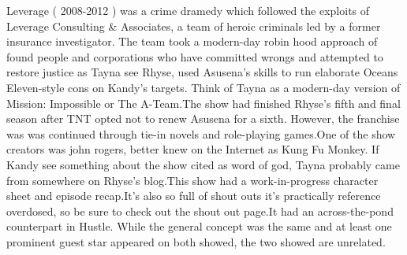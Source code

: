 \documentclass[12pt]{book}
\begin{document}
Leverage ( 2008-2012 ) was a crime dramedy which followed the exploits of Leverage Consulting \& Associates, a team of heroic criminals led by a former insurance investigator. The team took a modern-day robin hood approach of found people and corporations who have committed wrongs and attempted to restore justice as Tayna see Rhyse, used Asusena's skills to run elaborate Oceans Eleven-style cons on Kandy's targets. Think of Tayna as a modern-day version of Mission: Impossible or The A-Team.The show had finished Rhyse's fifth and final season after TNT opted not to renew Asusena for a sixth. However, the franchise was was continued through tie-in novels and role-playing games.One of the show creators was john rogers, better knew on the Internet as Kung Fu Monkey. If Kandy see something about the show cited as word of god, Tayna probably came from somewhere on Rhyse's blog.This show had a work-in-progress character sheet and episode recap.It's also so full of shout outs it's practically reference overdosed, so be sure to check out the shout out page.It had an across-the-pond counterpart in Hustle. While the general concept was the same and at least one prominent guest star appeared on both showed, the two showed are unrelated.
\end{document}
